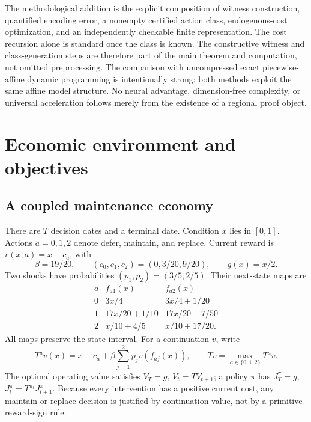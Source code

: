 The methodological addition is the explicit composition of witness construction, quantified encoding error, a nonempty certified action class, endogenous-cost optimization, and an independently checkable finite representation. The cost recursion alone is standard once the class is known. The constructive witness and class-generation steps are therefore part of the main theorem and computation, not omitted preprocessing. The comparison with uncompressed exact piecewise-affine dynamic programming is intentionally strong: both methods exploit the same affine model structure. No neural advantage, dimension-free complexity, or universal acceleration follows merely from the existence of a regional proof object.

\section{Economic environment and objectives}\label{sec:model}
\subsection{A coupled maintenance economy}
There are $T$ decision dates and a terminal date. Condition $x$ lies in $[0,1]$. Actions $a=0,1,2$ denote defer, maintain, and replace. Current reward is $r(x,a)=x-c_a$, with
\begin{equation}\label{eq:primitives}
 \beta=19/20,\qquad (c_0,c_1,c_2)=(0,3/20,9/20),\qquad g(x)=x/2.
\end{equation}
Two shocks have probabilities $(p_1,p_2)=(3/5,2/5)$. Their next-state maps are
\begin{equation}\label{eq:maps}
\begin{array}{c|cc}
 a&f_{a1}(x)&f_{a2}(x)\\\hline
 0&3x/4&3x/4+1/20\\
 1&17x/20+1/10&17x/20+7/50\\
 2&x/10+4/5&x/10+17/20.
\end{array}
\end{equation}
All maps preserve the state interval. For a continuation $v$, write
\begin{equation}
 T^a v(x)=x-c_a+\beta\sum_{j=1}^2p_jv(f_{aj}(x)),\qquad
 Tv=\max_{a\in\{0,1,2\}}T^a v.
\end{equation}
The optimal operating value satisfies $V_T=g$, $V_t=TV_{t+1}$; a policy $\pi$ has $J_T^\pi=g$, $J_t^\pi=T^{\pi_t}J_{t+1}^\pi$. Because every intervention has a positive current cost, any maintain or replace decision is justified by continuation value, not by a primitive reward-sign rule.

